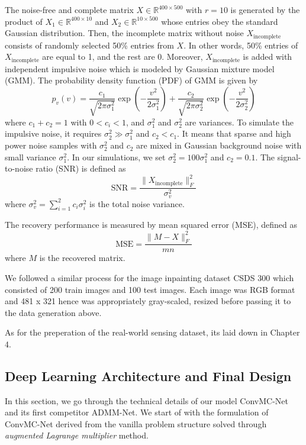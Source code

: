 The noise-free and complete matrix $X \in \mathbb{R}^{400 \times 500}$ with $r = 10$ is generated by the product of $X_1 \in \mathbb{R}^{400 \times 10}$ and $X_2 \in \mathbb{R}^{10 \times 500}$ whose entries obey the standard Gaussian distribution. Then, the incomplete matrix without noise $X_{\text{incomplete}}$ consists of randomly selected 50\% entries from $X$. In other words, 50\% entries of $X_{\text{incomplete}}$ are equal to 1, and the rest are 0. Moreover, $X_{\text{incomplete}}$ is added with independent impulsive noise which is modeled by Gaussian mixture model (GMM). The probability density function (PDF) of GMM is given by
\[
p_v(v) = \frac{c_1 }{\sqrt{2\pi\sigma_1^2}} \exp\left(-\frac{v^2}{2\sigma_1^2}\right) + \frac{c_2}{ \sqrt{2\pi\sigma_2^2}}\exp\left(-\frac{v^2}{2\sigma_2^2}\right)
\]
where $c_1 + c_2 = 1$ with $0 < c_i < 1$, and $\sigma_1^2$ and $\sigma_2^2$ are variances. To simulate the impulsive noise, it requires $\sigma_2^2 \gg \sigma_1^2$ and $c_2 < c_1$. It means that sparse and high power noise samples with $\sigma_2^2$ and $c_2$ are mixed in Gaussian background noise with small variance $\sigma_1^2$. In our simulations, we set $\sigma_2^2 = 100\sigma_1^2$ and $c_2 = 0.1$. The signal-to-noise ratio (SNR) is defined as
\[
\text{SNR} = \frac{\|X_{\text{incomplete}}\|_F^2}{\sigma_v^2}
\]
where $\sigma_v^2 = \sum_{i=1}^{2} c_i \sigma_i^2$ is the total noise variance.

The recovery performance is measured by mean squared error (MSE), defined as
\[
\text{MSE} = \frac{\|M - X\|_F^2}{mn}
\]
where $M$ is the recovered matrix.

We followed a similar process for the image inpainting dataset CSDS 300 which consisted of 200 train images and 100 test images. Each image was RGB format and 481 x 321 hence was appropriately gray-scaled, resized before passing it to the data generation above. 

As for the preperation of the real-world sensing dataset, its laid down in Chapter 4. 

\subsection{Deep Learning Architecture and Final Design}

In this section, we go through the technical details of our model ConvMC-Net and its first competitor ADMM-Net. We start of with the formulation of ConvMC-Net derived from the vanilla problem structure solved through \textit{augmented Lagrange multiplier} method. 

